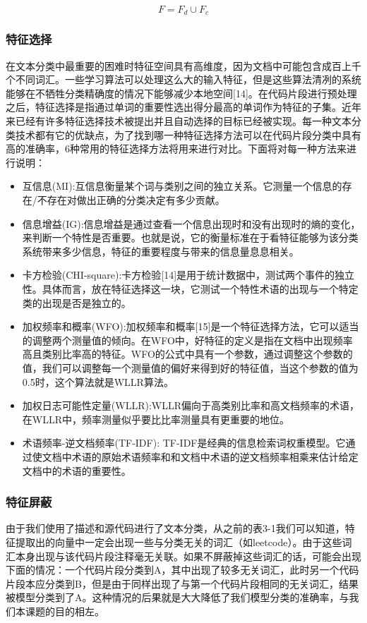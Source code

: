 \documentclass[10pt,journal,draftcls,onecolumn]{IEEEtran}
\begin{document}
\begin{CJK*}{UTF8}{gbsn}
\begin{equation}\label{equation_element}
F=F_d\cup F_c
\end{equation}

\subsubsection{特征选择}
在文本分类中最重要的困难时特征空间具有高维度，因为文档中可能包含成百上千个不同词汇。一些学习算法可以处理这么大的输入特征，但是这些算法清冽的系统能够在不牺牲分类精确度的情况下能够减少本地空间[14]。在代码片段进行预处理之后，特征选择是指通过单词的重要性选出得分最高的单词作为特征的子集。近年来已经有许多特征选择技术被提出并且自动选择的目标已经被实现。每一种文本分类技术都有它的优缺点，为了找到哪一种特征选择方法可以在代码片段分类中具有高的准确率，6种常用的特征选择方法将用来进行对比。下面将对每一种方法来进行说明： 
\begin{itemize}
    \item 互信息(MI):互信息衡量某个词与类别之间的独立关系。它测量一个信息的存在/不存在对做出正确的分类决定有多少贡献。
    \item 信息增益(IG):信息增益是通过查看一个信息出现时和没有出现时的熵的变化，来判断一个特性是否重要。也就是说，它的衡量标准在于看特征能够为该分类系统带来多少信息，特征的重要程度与带来的信息量息息相关。
    \item 卡方检验(CHI-square):卡方检验[14]是用于统计数据中，测试两个事件的独立性。具体而言，放在特征选择这一块，它测试一个特性术语的出现与一个特定类的出现是否是独立的。
    \item 加权频率和概率(WFO):加权频率和概率[15]是一个特征选择方法，它可以适当的调整两个测量值的倾向。在WFO中，好特征的定义是指在文档中出现频率高且类别比率高的特征。WFO的公式中具有一个参数，通过调整这个参数的值，我们可以调整每一个测量值的偏好来得到好的特征值，当这个参数的值为0.5时，这个算法就是WLLR算法。
    \item 加权日志可能性定量(WLLR):WLLR偏向于高类别比率和高文档频率的术语，在WLLR中，频率测量似乎要比比率测量具有更重要的地位。
    \item 术语频率-逆文档频率(TF-IDF): TF-IDF是经典的信息检索词权重模型。它通过使文档中术语的原始术语频率和和文档中术语的逆文档频率相乘来估计给定文档中的术语的重要性。
\end{itemize}



\subsubsection{特征屏蔽}
由于我们使用了描述和源代码进行了文本分类，从之前的表3-1我们可以知道，特征提取出的向量中一定会出现一些与分类无关的词汇（如leetcode）。由于这些词汇本身出现与该代码片段注释毫无关联。如果不屏蔽掉这些词汇的话，可能会出现下面的情况：一个代码片段分类到A，其中出现了较多无关词汇，此时另一个代码片段本应分类到B，但是由于同样出现了与第一个代码片段相同的无关词汇，结果被模型分类到了A。这种情况的后果就是大大降低了我们模型分类的准确率，与我们本课题的目的相左。


\end{CJK*}
\end{document}
